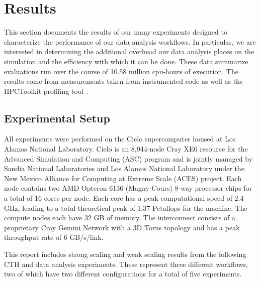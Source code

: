 \section{Results}
\label{sec:Results}

This section documents the results of our many experiments designed to
characterize the performance of our data analysis workflows.  In
particular, we are interested in determining the additional overhead our
data analysis places on the simulation and the efficiency with which it can be
done.  These data summarize evaluations run over the course of 10.58 million
cpu-hours of execution.  The results come from measurements taken from
instrumented code as well as the HPCToolkit profiling
tool~\cite{adhianto:hpctoolkit}.

\subsection{Experimental Setup}

All experiments were performed on the Cielo supercomputer housed at Los Alamos
National Laboratory.  Cielo is an 8,944-node Cray XE6 resource for the Advanced
Simulation and Computing (ASC) program and is jointly managed by Sandia National
Laboratories and Los Alamos National Laboratory under the New Mexico
Alliance for Computing at Extreme Scale (ACES) project.  Each node contains
two AMD Opteron 6136 (Magny-Cours) 8-way processor chips for a total of 16 cores
per node.  Each core has a peak computational speed of 2.4 GHz, leading to a total
theoretical peak of 1.37 Petaflops for the machine. The compute nodes each
have 32 GB of memory.  The interconnect consists of a proprietary Cray Gemini
Network with a 3D Torus topology and has a peak throughput rate of 6 GB/s/link.

This report includes strong scaling and weak scaling results from the
following CTH and data analysis experiments.  These represent three different
workflows, two of which have two different configurations for a total of
five experiments.

